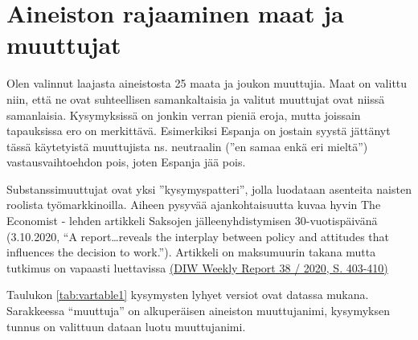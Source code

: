 \documentclass[
  finnish,
]{book}
\begin{document}
\hypertarget{aineiston-rajaaminen-maat-ja-muuttujat}{%
\section{Aineiston rajaaminen maat ja muuttujat}\label{aineiston-rajaaminen-maat-ja-muuttujat}}

Olen valinnut laajasta aineistosta 25 maata ja joukon muuttujia. Maat on valittu
niin, että ne ovat suhteellisen samankaltaisia ja valitut muuttujat ovat niissä
samanlaisia. Kysymyksissä on jonkin verran pieniä eroja, mutta joissain
tapauksissa ero on merkittävä. Esimerkiksi Espanja on jostain syystä jättänyt
tässä käytetyistä muuttujista ns. neutraalin (''en samaa enkä eri mieltä'')
vastausvaihtoehdon pois, joten Espanja jää pois.

Substanssimuuttujat ovat yksi ''kysymyspatteri'', jolla luodataan asenteita
naisten roolista työmarkkinoilla. Aiheen pysyvää ajankohtaisuutta kuvaa hyvin
The Economist - lehden artikkeli Saksojen jälleenyhdistymisen 30-vuotispäivänä
(3.10.2020, ``A report\ldots reveals the interplay between policy and attitudes that
influences the decision to work.'').
Artikkeli on maksumuurin takana mutta tutkimus on vapaasti luettavissa
\href{https://www.diw.de/de/diw_01.c.799302.de/publikationen/weekly_reports/2020_38_1/mothers_in_eastern_and_western_germany__employment_rates_and_attitudes_are_converging__full-time_employment_is_not.html}{(DIW Weekly Report 38 / 2020, S. 403-410)}

Taulukon \ref{tab:vartable1} kysymysten lyhyet versiot ovat datassa mukana.
Sarakkeessa ``muuttuja'' on alkuperäisen aineiston muuttujanimi,
kysymyksen tunnus on valittuun dataan luotu muuttujanimi.
\end{document}
